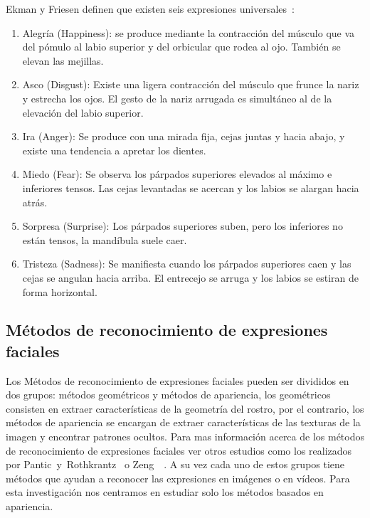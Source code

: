 \newpage
Ekman y Friesen definen que existen seis expresiones universales~\cite{Ekman2003}: 

\begin{enumerate}
	\item Alegría (Happiness): se produce mediante la contracción del músculo que va del pómulo al labio superior y del orbicular que rodea al ojo. También se elevan las mejillas. 
	\item Asco (Disgust): Existe una ligera contracción del músculo que frunce la nariz y estrecha los ojos. El gesto de la nariz arrugada es simultáneo al de la elevación del labio superior. 
	\item Ira (Anger): Se produce con una mirada fija, cejas juntas y hacia abajo, y existe una tendencia a apretar los dientes. 
	\item Miedo (Fear): Se observa los párpados superiores elevados al máximo e inferiores tensos. Las cejas levantadas se acercan y los labios se alargan hacia atrás. 
	\item Sorpresa (Surprise): Los párpados superiores suben, pero los inferiores no están tensos, la mandíbula suele caer. 
	\item Tristeza (Sadness): Se manifiesta cuando los párpados superiores caen y las cejas se angulan hacia arriba. El entrecejo se arruga y los labios se estiran de forma horizontal.
\end{enumerate}


\subsection{Métodos de reconocimiento de expresiones faciales}
Los Métodos de reconocimiento de expresiones faciales pueden ser divididos en dos grupos: métodos geométricos y métodos de apariencia, los geométricos consisten en extraer características de la geometría del rostro, por el contrario, los métodos de apariencia se encargan de extraer características de las texturas de la imagen y encontrar patrones ocultos. Para mas información acerca de los métodos de reconocimiento de expresiones faciales  ver otros estudios como los realizados por Pantic~y~Rothkrantz~\cite{Pantic2000} o Zeng~\etal~\cite{Zeng2009}. A su vez cada uno de estos grupos tiene métodos que ayudan a reconocer las expresiones en imágenes o en vídeos. Para esta investigación nos centramos en estudiar solo los métodos basados en apariencia.

